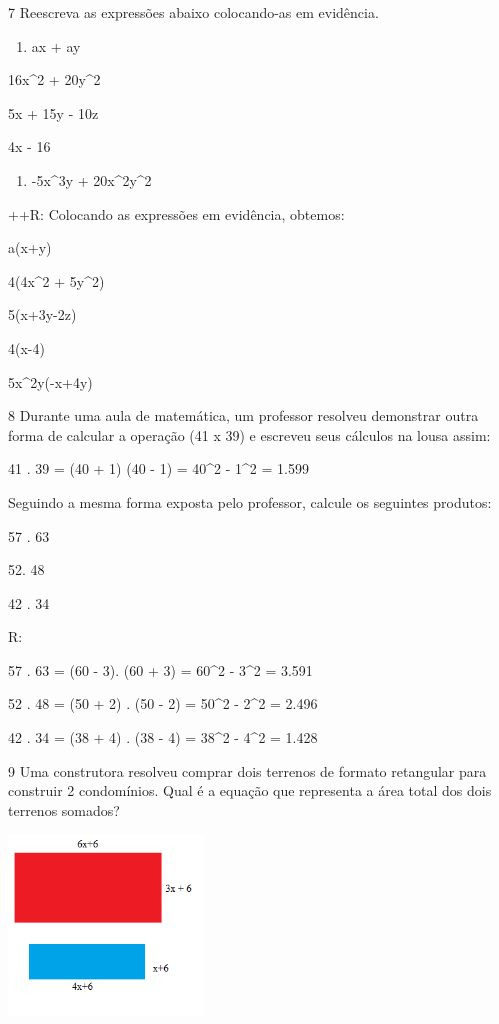 {\num{7} Reescreva as expressões abaixo colocando-as em evidência.

\begin{enumerate}
\def\labelenumi{\alph{enumi})}
\tightlist
\item
  ax + ay
\end{enumerate}
\item 16x^2 + 20y^2
\item 5x + 15y - 10z
\item 4x - 16

\begin{enumerate}
\def\labelenumi{\alph{enumi})}
\setcounter{enumi}{4}
\tightlist
\item -5x^3y + 20x^2y^2
\end{enumerate}

++R: Colocando as expressões em evidência, obtemos:
\item a(x+y)
\item 4(4x^2 + 5y^2)
\item 5(x+3y-2z)
\item 4(x-4)
\item 5x^2y(-x+4y)

\num{8} Durante uma aula de matemática, um professor resolveu demonstrar
outra forma de calcular a operação (41 x 39) e escreveu seus cálculos na
lousa assim:

41 . 39 = (40 + 1) (40 - 1) = 40^2 - 1^2 = 1.599

Seguindo a mesma forma exposta pelo professor, calcule os seguintes
produtos:
\item 57 . 63
\item 52. 48
\item 42 . 34

R:
\item 57 . 63 = (60 - 3). (60 + 3) = 60^2 - 3^2 = 3.591
\item 52 . 48 = (50 + 2) . (50 - 2) = 50^2 - 2^2 = 2.496
\item 42 . 34 = (38 + 4) . (38 - 4) = 38^2 - 4^2 = 1.428

\num{9} Uma construtora resolveu comprar dois terrenos de formato retangular
para construir 2 condomínios. Qual é a equação que representa a área
total dos dois terrenos somados?

\includegraphics[width=2.04167in,height=1.8873in]{./imgSAEB_8_MAT/media/image5.png}

}
